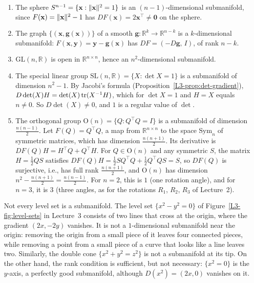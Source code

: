 \begin{example}\label{A-ex:submanifolds}
    \begin{enumerate}
        \item The sphere $S^{n-1} = \{\mathbf{x} : \lVert \mathbf{x} \rVert^2 = 1\}$ is an $(n - 1)$-dimensional submanifold, since $F(\mathbf{x}) = \lVert \mathbf{x} \rVert^2 - 1$ has $DF(\mathbf{x}) = 2\mathbf{x}^\top \neq \mathbf{0}$ on the sphere.
        \item The graph $\{(\mathbf{x}, \mathbf{g}(\mathbf{x}))\}$ of a smooth $\mathbf{g}: \mathbb{R}^k \to \mathbb{R}^{n-k}$ is a $k$-dimensional submanifold: $F(\mathbf{x}, \mathbf{y}) = \mathbf{y} - \mathbf{g}(\mathbf{x})$ has $DF = (-D\mathbf{g}, \, I)$, of rank $n - k$.
        \item $\mathrm{GL}(n, \mathbb{R})$ is open in $\mathbb{R}^{n \times n}$, hence an $n^2$-dimensional submanifold.
        \item The special linear group $\mathrm{SL}(n, \mathbb{R}) = \{X : \det X = 1\}$ is a submanifold of dimension $n^2 - 1$. By Jacobi's formula (Proposition~\ref{L3-prop:det-gradient}), $D\det(X)H = \det(X)\operatorname{tr}(X^{-1}H)$, which for $\det X = 1$ and $H = X$ equals $n \neq 0$. So $D\det(X) \neq 0$, and $1$ is a regular value of $\det$.
        \item The orthogonal group $\mathrm{O}(n) = \{Q : Q^\top Q = I\}$ is a submanifold of dimension $\frac{n(n-1)}{2}$. Let $F(Q) = Q^\top Q$, a map from $\mathbb{R}^{n \times n}$ to the space $\mathrm{Sym}_n$ of symmetric matrices, which has dimension $\frac{n(n+1)}{2}$. Its derivative is $DF(Q)H = H^\top Q + Q^\top H$. For $Q \in \mathrm{O}(n)$ and any symmetric $S$, the matrix $H = \frac{1}{2}QS$ satisfies $DF(Q)H = \frac{1}{2}SQ^\top Q + \frac{1}{2}Q^\top QS = S$, so $DF(Q)$ is surjective, i.e., has full rank $\frac{n(n+1)}{2}$, and $\mathrm{O}(n)$ has dimension $n^2 - \frac{n(n+1)}{2} = \frac{n(n-1)}{2}$. For $n = 2$, this is $1$ (one rotation angle), and for $n = 3$, it is $3$ (three angles, as for the rotations $R_1$, $R_2$, $R_3$ of Lecture~2).
    \end{enumerate}
\end{example}

Not every level set is a submanifold. The level set $\{x^2 - y^2 = 0\}$ of Figure~\ref{L3-fig:level-sets} in Lecture~3 consists of two lines that cross at the origin, where the gradient $(2x, -2y)$ vanishes. It is not a $1$-dimensional submanifold near the origin: removing the origin from a small piece of it leaves four connected pieces, while removing a point from a small piece of a curve that looks like a line leaves two. Similarly, the double cone $\{x^2 + y^2 = z^2\}$ is not a submanifold at its tip. On the other hand, the rank condition is sufficient, but not necessary: $\{x^2 = 0\}$ is the $y$-axis, a perfectly good submanifold, although $D(x^2) = (2x, 0)$ vanishes on it.

